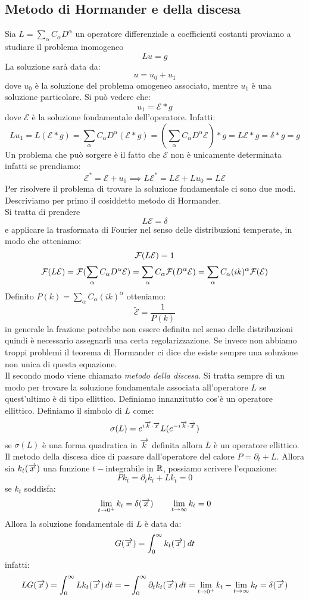 \subsection{Metodo di Hormander e della discesa}
Sia $L = \sum_{\alpha}C_\alpha D^\alpha$ un operatore differenziale a coefficienti costanti proviamo a studiare il problema inomogeneo
\[Lu = g\]
La soluzione sarà data da:
\[u=u_0+u_1\]
dove $u_0$ è la soluzione del problema omogeneo associato, mentre $u_1$ è una soluzione particolare. Si può vedere che:
\[u_1 = \mathcal{E}*g\]
dove $\mathcal{E}$ è la soluzione fondamentale dell'operatore. Infatti:
\[Lu_1 = L(\mathcal{E}*g) =  \sum_{\alpha}C_\alpha D^\alpha (\mathcal{E}*g) = ( \sum_{\alpha}C_\alpha D^\alpha\mathcal{E})*g = L\mathcal{E}*g = \delta*g=g\]
Un problema che può sorgere è il fatto che $\mathcal{E}$ non è unicamente determinata infatti se prendiamo:
\[\mathcal{E}^* = \mathcal{E}+u_0 \implies L\mathcal{E}^* = L\mathcal{E} +Lu_0 = L\mathcal{E}\]
Per risolvere il problema di trovare la soluzione fondamentale ci sono due modi. Descriviamo per primo il cosiddetto metodo di Hormander.\\
Si tratta di prendere
\[L\mathcal{E}=\delta\]
e applicare la trasformata di Fourier nel senso delle distribuzioni temperate, in modo che otteniamo:
\[\mathcal{F}(L\mathcal{E}) = 1 \]
\[\mathcal{F}(L\mathcal{E}) = \mathcal{F}(\sum_{\alpha}C_\alpha D^\alpha\mathcal{E}) = \sum_{\alpha}C_\alpha \mathcal{F}(D^\alpha\mathcal{E}) =  \sum_{\alpha}C_\alpha (ik)^\alpha\mathcal{F}(\mathcal{E})\]
Definito $P(k) =\sum_{\alpha}C_\alpha (ik)^\alpha$ otteniamo:
\[\tilde{\mathcal{E}} = \frac{1}{P(k)}\]
in generale la frazione potrebbe non essere definita nel senso delle distribuzioni quindi è necessario assegnarli una certa regolarizzazione. Se invece non abbiamo troppi problemi il teorema di Hormander ci dice che esiste sempre una soluzione non unica di questa equazione.\\
\newline Il secondo modo viene chiamato \emph{metodo della discesa}. Si tratta sempre di un modo per trovare la soluzione fondamentale associata all'operatore $L$ se quest'ultimo è di tipo ellittico. Definiamo innanzitutto cos'è un operatore ellittico. Definiamo il simbolo di $L$ come:
\[\sigma(L) = e^{i\overrightarrow{k}\cdot \overrightarrow{x}}L(e^{-i\overrightarrow{k}\cdot \overrightarrow{x}})\]
se $\sigma(L)$ è una forma quadratica in $\overrightarrow{k}$ definita allora $L$ è un operatore ellittico.\\
Il metodo della discesa dice di passare dall'operatore del calore $P =\partial_t + L$. Allora sia $k_t(\overrightarrow{x})$ una funzione $t-$integrabile in $\mathbb{R}$, possiamo scrivere l'equazione:
\[Pk_t = \partial_tk_t +Lk_t= 0\]
se $k_t$ soddisfa:
\[\lim_{t\to0^+}k_t=\delta(\overrightarrow{x})\qquad \lim_{t\to\infty}k_t = 0\]
Allora la soluzione fondamentale di $L$ è data da:
\[G(\overrightarrow{x}) = \int_0^\infty k_t(\overrightarrow{x})\,dt\]
infatti:
\[LG(\overrightarrow{x}) =  \int_0^\infty Lk_t(\overrightarrow{x})\,dt = - \int_0^\infty \partial_tk_t(\overrightarrow{x})\,dt = \lim_{t\to0^+}k_t - \lim_{t\to\infty}k_t = \delta(\overrightarrow{x})\]
